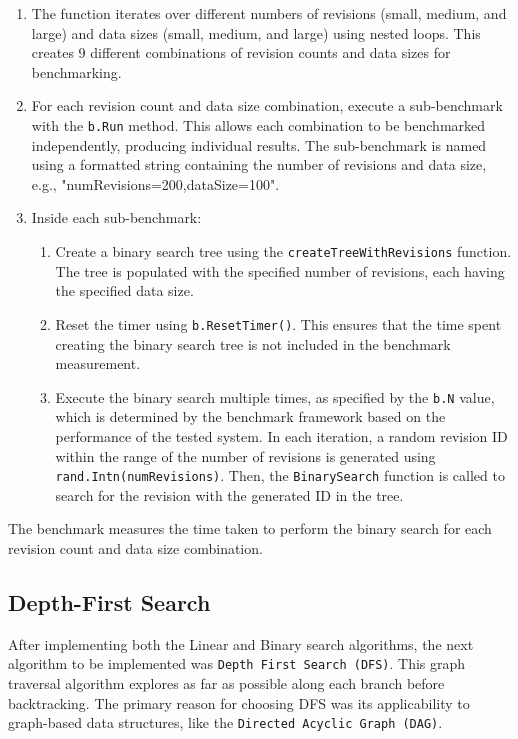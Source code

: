 \begin{enumerate}
    \item The function iterates over different numbers of revisions (small, medium, and large) and data sizes (small, medium, and large) using nested loops. This creates 9 different combinations of revision counts and data sizes for benchmarking.
    \item For each revision count and data size combination, execute a sub-benchmark with the \lstinline{b.Run} method. This allows each combination to be benchmarked independently, producing individual results. The sub-benchmark is named using a formatted string containing the number of revisions and data size, e.g., "numRevisions=200,dataSize=100".
    \item Inside each sub-benchmark:
          \begin{enumerate}
              \item Create a binary search tree using the \lstinline{createTreeWithRevisions} function. The tree is populated with the specified number of revisions, each having the specified data size.
              \item Reset the timer using \lstinline{b.ResetTimer()}. This ensures that the time spent creating the binary search tree is not included in the benchmark measurement.
              \item Execute the binary search multiple times, as specified by the \lstinline{b.N} value, which is determined by the benchmark framework based on the performance of the tested system. In each iteration, a random revision ID within the range of the number of revisions is generated using \lstinline{rand.Intn(numRevisions)}. Then, the \lstinline{BinarySearch} function is called to search for the revision with the generated ID in the tree.
          \end{enumerate}
\end{enumerate}
The benchmark measures the time taken to perform the binary search for each revision count and data size combination.

\subsection{Depth-First Search}
After implementing both the Linear and Binary search algorithms, the next algorithm to be implemented was \lstinline{Depth First Search (DFS)}. This graph traversal algorithm explores as far as possible along each branch before backtracking. The primary reason for choosing DFS was its applicability to graph-based data structures, like the \lstinline{Directed Acyclic Graph (DAG)}.

